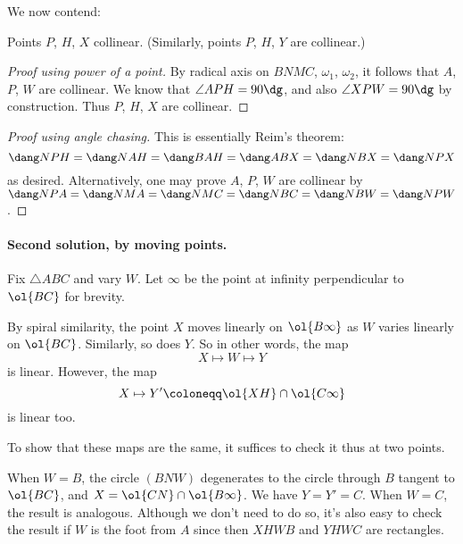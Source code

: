 We now contend:
\begin{claim*}
  Points $P$, $H$, $X$ collinear.
  (Similarly, points $P$, $H$, $Y$ are collinear.)
\end{claim*}
\begin{proof}
  [Proof using power of a point]
  By radical axis on $BNMC$, $\omega_1$, $\omega_2$,
  it follows that $A$, $P$, $W$ are collinear.
  We know that $\angle APH = 90\dg$, and also
  $\angle XPW = 90\dg$ by construction.
  Thus $P$, $H$, $X$ are collinear.
\end{proof}
\begin{proof}
  [Proof using angle chasing]
  This is essentially Reim's theorem:
  \[ \dang NPH = \dang NAH = \dang BAH = \dang ABX = \dang NBX = \dang NPX \]
  as desired.
  Alternatively, one may prove $A$, $P$, $W$ are collinear by
  $\dang NPA = \dang NMA = \dang NMC = \dang NBC = \dang NBW = \dang NPW$.
\end{proof}

\paragraph{Second solution, by moving points.}
Fix $\triangle ABC$ and vary $W$.
Let $\infty$ be the point at infinity perpendicular to $\ol{BC}$
for brevity.

By spiral similarity, the point $X$ moves linearly on $\ol{B\infty}$
as $W$ varies linearly on $\ol{BC}$.
Similarly, so does $Y$.
So in other words, the map \[ X \mapsto W \mapsto Y \]
is linear.
However, the map \[ X \mapsto Y' \coloneqq \ol{XH} \cap \ol{C\infty} \]
is linear too.

To show that these maps are the same,
it suffices to check it thus at two points.
\begin{itemize}
  \ii When $W = B$, the circle $(BNW)$
  degenerates to the circle through $B$ tangent to $\ol{BC}$,
  and $X = \ol{CN} \cap \ol{B\infty}$.
  We have $Y = Y' = C$.
  \ii When $W = C$, the result is analogous.
  \ii Although we don't need to do so,
  it's also easy to check the result if $W$
  is the foot from $A$
  since then $XHWB$ and $YHWC$ are rectangles.
\end{itemize}
\pagebreak
